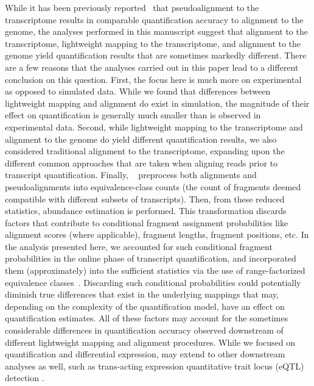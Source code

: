 While it has been previously
reported~\citep{direct_comparison} that pseudoalignment to the transcriptome
results in comparable quantification accuracy to alignment to the genome, the analyses
performed in this manuscript suggest that alignment to the transcriptome,
lightweight mapping to the transcriptome, and alignment to the genome yield
quantification results that are sometimes markedly different.
There are a few reasons that the analyses carried out in this paper lead to a
different conclusion on this question. First, the focus here is much more on
experimental as opposed to simulated data. While we found that differences
between lightweight mapping and alignment do exist in simulation, the magnitude
of their effect on quantification is generally much smaller than is observed in
experimental data. Second, while lightweight mapping to the transcriptome and alignment
to the genome do yield different quantification results, we also considered
traditional alignment to the
transcriptome, expanding upon the different common approaches that are taken
when aligning reads prior to transcript quantification. Finally, \citeauthor{direct_comparison}~\citep{direct_comparison} 
preprocess both alignments and
pseudoalignments into equivalence-class counts (the count of fragments deemed
compatible with different subsets of transcripts). Then, from these reduced
statistics, abundance estimation is performed. This transformation 
discards factors that contribute to conditional fragment assignment
probabilities like alignment scores (where applicable), fragment lengths, fragment positions, etc.
In the analysis presented here, we accounted for such conditional fragment
probabilities in the online phase of transcript quantification, and incorporated
them (approximately) into the sufficient statistics via the use of
range-factorized equivalence classes~\citep{ddfact}. Discarding such conditional
probabilities could potentially diminish true differences that exist in the
underlying mappings that may, depending on the complexity of the quantification
model, have an effect on quantification estimates. All of these factors may
account for the sometimes considerable differences in quantification accuracy
observed downstream of different lightweight mapping and alignment procedures.
While we focused on quantification and differential expression,
 may extend to other
downstream analyses as well, such as trans-acting expression quantitative trait
locus (eQTL) detection \cite{saha2018false}.

